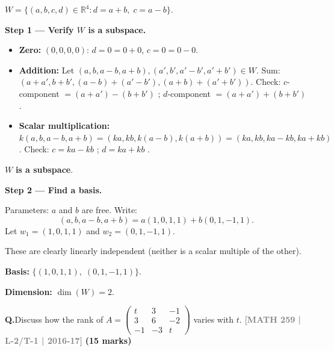 \documentclass[12pt,a3paper]{article}
\newcommand{\yr}[1]{\hfill\textcolor{gray}{\small\textbf{[#1]}}}
\newcommand{\mk}[1]{\textcolor{orange!70!black}{\small\textbf{(#1 marks)}}}
\newcounter{qnum}
\newcommand{\Q}[1]{%
  \needspace{4\baselineskip}
  \refstepcounter{qnum}
  \vspace{6pt}
  \noindent\textbf{Q\theqnum.}\enspace #1\par
}
\begin{document}
\begin{tcolorbox}[enhanced,breakable,colback=cC!4,colframe=cC,
  boxrule=0.8pt,arc=5pt,
  title={\textbf{Answer}},
  fonttitle=\bfseries\color{white},colbacktitle=cC]

$W=\{(a,b,c,d)\in\mathbb{R}^4 : d=a+b,\;c=a-b\}$.

\textbf{Step 1 --- Verify $W$ is a subspace.}

\begin{itemize}[itemsep=2pt]
  \item \textbf{Zero:} $(0,0,0,0)$: $d=0=0+0$, $c=0=0-0$. \checkmark
  \item \textbf{Addition:} Let $(a,b,a-b,a+b),(a',b',a'-b',a'+b')\in W$. Sum: $(a+a',b+b',(a-b)+(a'-b'),(a+b)+(a'+b'))$. Check: $c$-component $=(a+a')-(b+b')$ \checkmark; $d$-component $=(a+a')+(b+b')$ \checkmark.
  \item \textbf{Scalar multiplication:} $k(a,b,a-b,a+b)=(ka,kb,k(a-b),k(a+b))=(ka,kb,ka-kb,ka+kb)$. Check: $c=ka-kb$ \checkmark; $d=ka+kb$ \checkmark.
\end{itemize}
$W$ \textbf{is a subspace}.

\medskip
\textbf{Step 2 --- Find a basis.}

Parameters: $a$ and $b$ are free. Write:
\[
(a,b,a-b,a+b) = a(1,0,1,1)+b(0,1,-1,1).
\]
Let $w_1=(1,0,1,1)$ and $w_2=(0,1,-1,1)$.

These are clearly linearly independent (neither is a scalar multiple of the other).

\textbf{Basis:} $\{(1,0,1,1),\;(0,1,-1,1)\}$.

\textbf{Dimension:} $\dim(W)=2$.
\end{tcolorbox}

\Q{Discuss how the rank of $A = \begin{pmatrix} t & 3 & -1 \\ 3 & 6 & -2 \\ -1 & -3 & t \end{pmatrix}$ varies with $t$.
\yr{MATH 259 | L-2/T-1 | 2016-17} \mk{15}}
\end{document}
